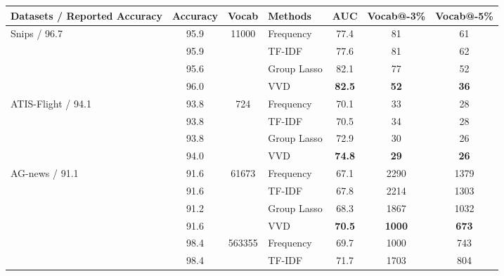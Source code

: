\begin{table*}[thb]
\centering
\small
\begin{tabular}{lcclccc} 
\toprule
Datasets / Reported Accuracy         & Accuracy & Vocab                & Methods             & AUC         & Vocab@-3\% & Vocab@-5\%  \\ 
\midrule
\multirow{4}{*}{Snips / 96.7~\cite{DBLP:conf/interspeech/LiuL16}} & 95.9       &  \multirow{4}{*}{11000} & Frequency       &  77.4    & 81         & 61          \\
                       & 95.9       &                        & TF-IDF           &   77.6   & 81           & 62          \\
                       & 95.6       &                        & Group Lasso       &   82.1   & 77           & 52\\
                       & 96.0 &                        & VVD & \textbf{82.5}  & \textbf{52}  & \textbf{36}         \\ 
\midrule
\multirow{4}{*}{ATIS-Flight / 94.1~\cite{goo2018slot}}  & 93.8       &  \multirow{4}{*}{724}    & Frequency      &  70.1   & 33           & 28    \\
                       & 93.8       &                        & TF-IDF           &  70.5  & 34          & 28\\
                       & 93.8       &                        & Group Lasso      &  72.9  & 30           & 26\\
                       & 94.0       &                        & VVD & \textbf{74.8}  & \textbf{29}  & \textbf{26}  \\
\midrule
\midrule
\multirow{5}{*}{AG-news / 91.1~\cite{zhang2015character}}     & 91.6       &     \multirow{4}{*}{61673} & Frequency    &  67.1 &    2290        & 1379\\
                             & 91.6       &                        & TF-IDF          &     67.8    &    2214     &    1303 \\

                             & 91.2       &                        & Group Lasso         &  68.3   &    1867     &  1032 \\
                             & 91.6       &                        & VVD & \textbf{70.5}  &  \textbf{1000}  & \textbf{673}   \\ 
\midrule
\multirow{4}{*}{DBPedia / 98.3~\cite{zhang2015character}}     & 98.4       &  \multirow{4}{*}{563355} & Frequency          &  69.7 &    1000    & 743            \\
                             & 98.4       &                        & TF-IDF           &   71.7    & 1703           & 804      \\


\end{tabular}
\end{table*}
